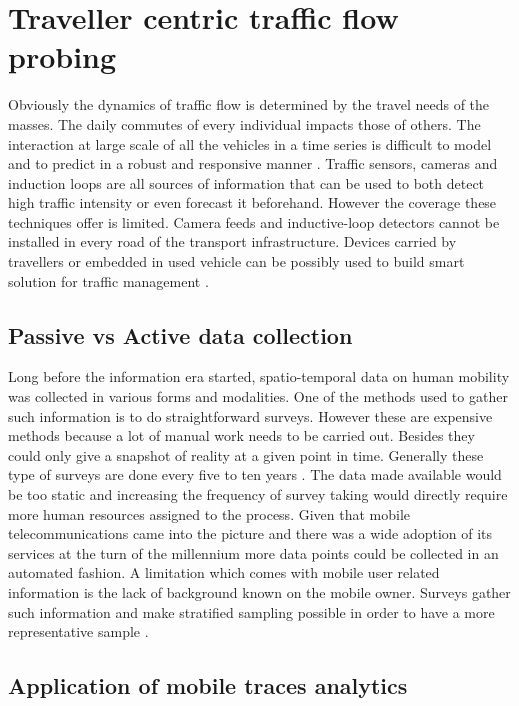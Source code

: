 \documentclass[12pt, a4paper]{report}
\theoremstyle{definition}
\theoremstyle{definition}%
\theoremstyle{definition}%
\theoremstyle{definition}%
\theoremstyle{definition}%
\theoremstyle{definition}%
\begin{document}
\section{Traveller centric traffic flow probing} \label{section:introduction:traveller_centric_traffic_flow_probing}

Obviously the dynamics of traffic flow is determined by the travel needs of the masses. The daily commutes of every individual impacts those of others. The interaction at large scale of all the vehicles in a time series is difficult to model and to predict in a robust and responsive manner \cite{VLAHOGIANNI20143}. Traffic sensors, cameras and induction loops are all sources of information that can be used to both detect high traffic intensity or even forecast it beforehand.  However the coverage these techniques offer is limited. Camera feeds and inductive-loop detectors cannot be installed in every road of the transport infrastructure. Devices carried by travellers or embedded in used vehicle can be possibly used to build smart solution for traffic management \cite{VLAHOGIANNI20143}.


\subsection{Passive vs Active data collection}
Long before the information era started, spatio-temporal data on human mobility was collected in various forms and modalities. One of the methods used to gather such information is to do straightforward surveys\cite{Calabrese2013,Colak2015}. However these are expensive methods because a lot of manual work needs to be carried out. Besides they could only give a snapshot of reality at a given point in time.  Generally these type of surveys are done every five to ten years \cite{Toole2015}. The data made available would be too static and increasing the frequency of survey taking would directly require more human resources assigned to the process. Given that mobile telecommunications came into the picture and there was a wide adoption of its services at the turn of the millennium more data points could be collected in an automated fashion. A limitation which comes with mobile user related information is the lack of background known on the mobile owner. Surveys gather such information and make stratified sampling possible in order to have a more representative sample \cite{Colak2015}.

\subsection{Application of mobile traces analytics} \label{section:introduction:application_mobile_traces}
\end{document}
